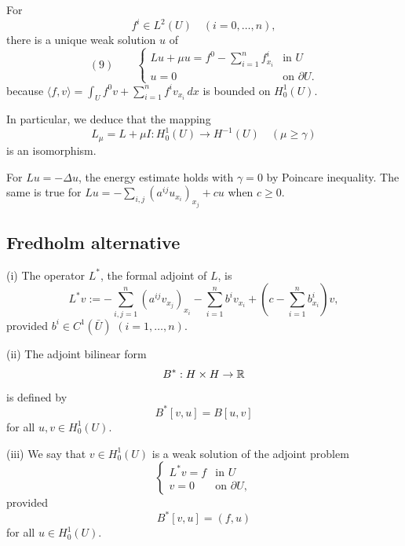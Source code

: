 \begin{remark}
\label{rem:general-rhs-weak-solution-isomorphism}

For
$$f^i \in L^2(U) \quad (i=0,\ldots,n),$$
there is a unique weak solution $u$ of
$$(9) \qquad \begin{cases} Lu + \mu u = f^0 - \sum_{i=1}^n f^i_{x_i} & \text{in } U \\ u = 0 & \text{on } \partial U. \end{cases}$$
because $\langle f,v\rangle = \int_U f^0v + \sum_{i=1}^n f^iv_{x_i}\,dx$ is bounded on $H_0^1(U)$.

In particular, we deduce that the mapping
$$L_\mu = L + \mu I : H_0^1(U) \to H^{-1}(U) \quad (\mu \geq \gamma)$$
is an isomorphism.
\end{remark}

\begin{example}
\label{ex:energy-estimates-gamma-zero-examples}

For $Lu=-\Delta u$, the energy estimate holds with $\gamma=0$ by Poincare inequality. The same is true for $Lu=-\sum_{i,j}(a^{ij}u_{x_i})_{x_j}+cu$ when $c\ge0$.
\end{example}

\subsection{Fredholm alternative}

\begin{definition}
\label{def:formal-adjoint-operator}

(i) The operator $L^*$, the formal adjoint of $L$, is
$$L^*v := -\sum_{i,j=1}^n(a^{ij}v_{x_j})_{x_i} - \sum_{i=1}^n b^iv_{x_i} + \left(c - \sum_{i=1}^n b^i_{x_i}\right)v,$$
provided $b^i \in C^1(\bar U)$ $(i=1,\ldots,n)$.

(ii) The adjoint bilinear form
$$B^* : H \times H \to \mathbb{R}$$
is defined by
$$B^*[v,u] = B[u,v]$$
for all $u,v \in H_0^1(U)$.

(iii) We say that $v \in H_0^1(U)$ is a weak solution of the adjoint problem
$$\begin{cases} L^*v = f & \text{in } U \\ v = 0 & \text{on } \partial U, \end{cases}$$
provided
$$B^*[v,u] = (f,u)$$
for all $u \in H_0^1(U)$.
\end{definition}


